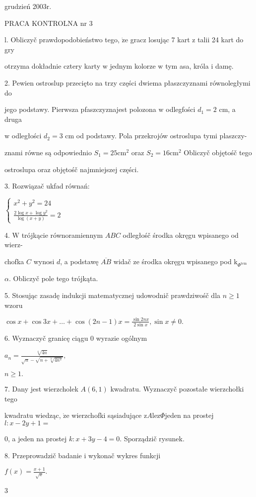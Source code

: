 \documentclass[a4paper,12pt]{article}
\begin{document}
grudzień 2003r.

PRACA KONTROLNA nr 3

l. Obliczyč prawdopodobieństwo tego, $\dot{\mathrm{z}}\mathrm{e}$ gracz losując 7 kart $\mathrm{z}$ talii 24 kart do gry

otrzyma dokładnie cztery karty $\mathrm{w}$ jednym kolorze $\mathrm{w}$ tym asa, króla $\mathrm{i}$ damę.

2. Pewien ostroslup przecięto na trzy części dwiema płaszczyznami równoległymi do

jego podstawy. Pierwsza pfaszczyznajest polozona $\mathrm{w}$ odlegfości $d_{1}=2$ cm, a druga

$\mathrm{w}$ odległości $d_{2}=3$ cm od podstawy. Pola przekrojów ostroslupa tymi plaszczy-

znami równe są odpowiednio $S_{1}=25\mathrm{c}\mathrm{m}^{2}$ oraz $S_{2}=16\mathrm{c}\mathrm{m}^{2}$ Obliczyč objętośč tego

ostroslupa oraz objętośč najmniejszej części.

3. Rozwiązač ukfad równań:

$\left\{\begin{array}{l}
x^{2}+y^{2}=24\\
\frac{2\log x+\log y^{2}}{\log(x+y)}=2
\end{array}\right.$

4. $\mathrm{W}$ trójkącie równoramiennym $ABC$ odległośč środka okręgu wpisanego od wierz-

chofka $C$ wynosi $d$, a podstawę $\overline{AB}$ widač ze środka okręgu wpisanego pod $\mathrm{k}_{\Phi^{\mathrm{t}\mathrm{e}\mathrm{m}}}$

$\alpha$. Obliczyč pole tego trójkąta.

5. Stosując zasadę indukcji matematycznej udowodnič prawdziwośč dla $n\geq 1$ wzoru

$\displaystyle \cos x+\cos 3x+\ldots+\cos(2n-1)x=\frac{\sin 2nx}{2\sin x},\sin x\neq 0.$

6. Wyznaczyč granicę ciągu 0 wyrazie ogólnym

$a_{n}=\displaystyle \frac{\sqrt[6]{4n}}{\sqrt{n}-\sqrt{n+\sqrt[3]{4n^{2}}}},$

$n\geq 1.$

7. Dany jest wierzcholek $A(6,1)$ kwadratu. Wyznaczyč pozostałe wierzchołki tego

kwadratu wiedząc, $\dot{\mathrm{z}}\mathrm{e}$ wierzchofki sąsiadujące $\mathrm{z}A\mathrm{l}\mathrm{e}\mathrm{z}\Phi$jeden na prostej $l:x-2y+1=$

$0$, a jeden na prostej $k:x+3y-4=0$. Sporządzič rysunek.

8. Przeprowadzič badanie $\mathrm{i}$ wykonač wykres funkcji

$f(x)=\displaystyle \frac{x+1}{\sqrt{x}}.$

3
\end{document}
